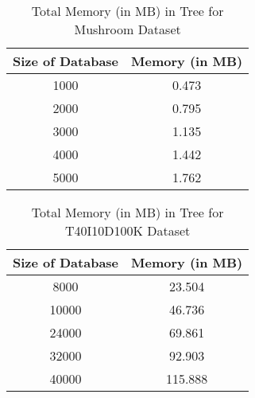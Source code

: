 %            
%            
%            
%        
		\begin{table}[h]
        \centering
        \begin{tabular}{|c|c|}
        \hline 
       Size of Database        &    Memory (in MB)\\    \hline\hline
        
				1000&0.473\\\hline
				2000&0.795\\\hline
				3000&1.135\\\hline
				4000&1.442\\\hline
				5000&1.762\\\hline
		
            \end{tabular}
        \caption{ Total Memory (in MB) in Tree for Mushroom Dataset}
        \label{result:g_m_const_tran_mem}
        \end{table}
		
		\begin{table}[h]
        \centering
        \begin{tabular}{|c|c|}
        \hline 
       Size of Database       &    Memory (in MB)\\    \hline\hline
        
				8000 &23.504\\\hline
				10000&46.736\\\hline
				24000&69.861\\\hline
				32000&92.903\\\hline
				40000&115.888\\\hline
		
            \end{tabular}
        \caption{ Total Memory (in MB) in Tree for T40I10D100K Dataset}
        \label{result:g_t10_const_tran_mem}
        \end{table}
